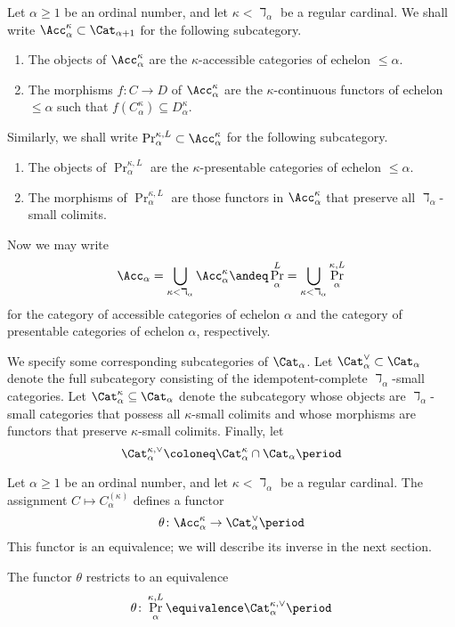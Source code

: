 \begin{notation}
	Let $ \alpha \geq 1 $ be an ordinal number, and
	let $ \kappa < \daleth_{\alpha} $ be a regular cardinal.
	We shall write $ \Acc^{\kappa}_{\alpha} \subset \Cat_{\alpha+1} $ for
	the following subcategory.
	\begin{enumerate}
		\item The objects of $ \Acc^{\kappa}_{\alpha} $ are
			the $ \kappa $-accessible categories of echelon $ \leq \alpha $.
		\item The morphisms $ f \colon C \to D $ of $ \Acc^{\kappa}_{\alpha} $ are
			the $ \kappa $-continuous functors of echelon $ \leq \alpha $
			such that $ f(C^{\kappa}_{\alpha}) \subseteq D^{\kappa}_{\alpha} $.
	\end{enumerate}
	Similarly, we shall write $ \Pr^{\kappa,L}_{\alpha} \subset \Acc^{\kappa}_{\alpha}$
	for the following subcategory.
	\begin{enumerate}
		\item The objects of $ \Pr^{\kappa,L}_{\alpha} $ are
			the $ \kappa $-presentable categories of echelon $ \leq \alpha $.
		\item The morphisms of $ \Pr^{\kappa,L}_{\alpha} $ are
			those functors in $ \Acc^{\kappa}_{\alpha} $
			that preserve all $ \daleth_{\alpha} $-small colimits.
	\end{enumerate}

	Now we may write
	\[
		\Acc_{\alpha} = \bigcup_{\kappa < \daleth_{\alpha}} \Acc^{\kappa}_{\alpha}
		\andeq 
		\Pr^L_{\alpha} = \bigcup_{\kappa < \daleth_{\alpha}} \Pr^{\kappa,L}_{\alpha}
	\]
	for the category of accessible categories of echelon $ \alpha $
	and the category of presentable categories of echelon $ \alpha $, respectively.

	We specify some corresponding subcategories of $ \Cat_{\alpha}$.
	Let $ \Cat_{\alpha}^{\vee} \subset \Cat_{\alpha} $ denote
	the full subcategory consisting of 
	the idempotent-complete $ \daleth_{\alpha} $-small categories.
	Let $ \Cat^{\kappa}_{\alpha} \subseteq \Cat_{\alpha} $ denote the subcategory
	whose objects are $ \daleth_{\alpha} $-small categories
	that possess all $ \kappa $-small colimits
	and whose morphisms are functors that preserve $ \kappa $-small colimits.
	Finally, let 
	\[ \Cat^{\kappa,\vee}_{\alpha} \coloneq \Cat^{\kappa}_{\alpha} \cap \Cat_{\alpha} \period \]
\end{notation}

\begin{nul}
	Let $ \alpha \geq 1 $ be an ordinal number,
	and let $ \kappa < \daleth_{\alpha} $ be a regular cardinal.
	The assignment $ C \mapsto C^{(\kappa)}_{\alpha} $ defines a functor
	\[ \theta \colon \Acc^{\kappa}_{\alpha} \to \Cat^{\vee}_{\alpha} \period \]
	This functor is an equivalence;
	we will describe its inverse in the next section.

	The functor $ \theta $ restricts to an equivalence
	\[ \theta \colon \Pr^{\kappa,L}_{\alpha} \equivalence \Cat^{\kappa,\vee}_{\alpha} \period \]
\end{nul}

